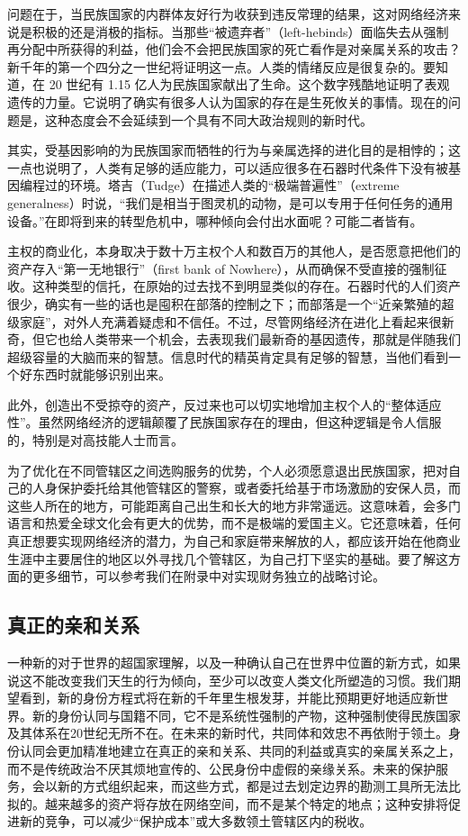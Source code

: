 问题在于，当民族国家的内群体友好行为收获到违反常理的结果，这对网络经济来说是积极的还是消极的指标。当那些“被遗弃者”（left-hebinds）面临失去从强制再分配中所获得的利益，他们会不会把民族国家的死亡看作是对亲属关系的攻击？新千年的第一个四分之一世纪将证明这一点。人类的情绪反应是很复杂的。要知道，在 20 世纪有 1.15 亿人为民族国家献出了生命。这个数字残酷地证明了表观遗传的力量。它说明了确实有很多人认为国家的存在是生死攸关的事情。现在的问题是，这种态度会不会延续到一个具有不同大政治规则的新时代。

其实，受基因影响的为民族国家而牺牲的行为与亲属选择的进化目的是相悖的；这一点也说明了，人类有足够的适应能力，可以适应很多在石器时代条件下没有被基因编程过的环境。塔吉（Tudge）在描述人类的“极端普遍性”（extreme generalness）时说，“我们是相当于图灵机的动物，是可以专用于任何任务的通用设备。”在即将到来的转型危机中，哪种倾向会付出水面呢？可能二者皆有。

主权的商业化，本身取决于数十万主权个人和数百万的其他人，是否愿意把他们的资产存入“第一无地银行”（first bank of Nowhere），从而确保不受直接的强制征收。这种类型的信托，在原始的过去找不到明显类似的存在。石器时代的人们资产很少，确实有一些的话也是囤积在部落的控制之下；而部落是一个“近亲繁殖的超级家庭”，对外人充满着疑虑和不信任。不过，尽管网络经济在进化上看起来很新奇，但它也给人类带来一个机会，去表现我们最新奇的基因遗传，那就是伴随我们超级容量的大脑而来的智慧。信息时代的精英肯定具有足够的智慧，当他们看到一个好东西时就能够识别出来。

此外，创造出不受掠夺的资产，反过来也可以切实地增加主权个人的“整体适应性”。虽然网络经济的逻辑颠覆了民族国家存在的理由，但这种逻辑是令人信服的，特别是对高技能人士而言。

为了优化在不同管辖区之间选购服务的优势，个人必须愿意退出民族国家，把对自己的人身保护委托给其他管辖区的警察，或者委托给基于市场激励的安保人员，而这些人所在的地方，可能距离自己出生和长大的地方非常遥远。这意味着，会多门语言和热爱全球文化会有更大的优势，而不是极端的爱国主义。它还意味着，任何真正想要实现网络经济的潜力，为自己和家庭带来解放的人，都应该开始在他商业生涯中主要居住的地区以外寻找几个管辖区，为自己打下坚实的基础。要了解这方面的更多细节，可以参考我们在附录中对实现财务独立的战略讨论。

\subsection{真正的亲和关系}
一种新的对于世界的超国家理解，以及一种确认自己在世界中位置的新方式，如果说这不能改变我们天生的行为倾向，至少可以改变人类文化所塑造的习惯。我们期望看到，新的身份方程式将在新的千年里生根发芽，并能比预期更好地适应新世界。新的身份认同与国籍不同，它不是系统性强制的产物，这种强制使得民族国家及其体系在20世纪无所不在。在未来的新时代，共同体和效忠不再依附于领土。身份认同会更加精准地建立在真正的亲和关系、共同的利益或真实的亲属关系之上，而不是传统政治不厌其烦地宣传的、公民身份中虚假的亲缘关系。未来的保护服务，会以新的方式组织起来，而这些方式，都是过去划定边界的勘测工具所无法比拟的。越来越多的资产将存放在网络空间，而不是某个特定的地点；这种安排将促进新的竞争，可以减少“保护成本”或大多数领土管辖区内的税收。

